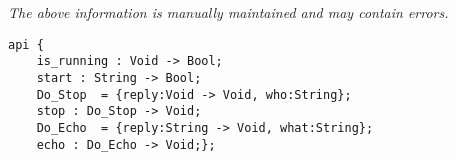 \label{api:Template\_Hostthread}

{\tiny \it The above information is manually maintained and may contain errors.}
\begin{verbatim}
api {
    is_running : Void -> Bool;
    start : String -> Bool;
    Do_Stop  = {reply:Void -> Void, who:String};
    stop : Do_Stop -> Void;
    Do_Echo  = {reply:String -> Void, what:String};
    echo : Do_Echo -> Void;};
\end{verbatim}
